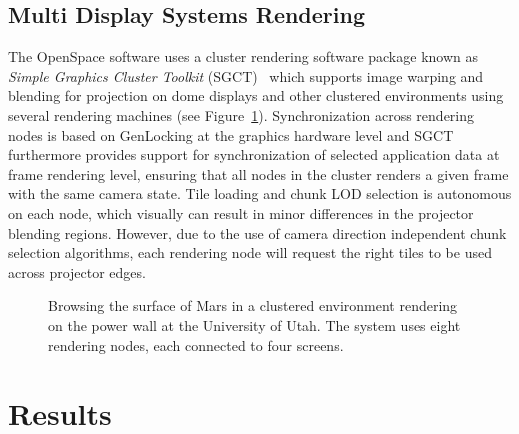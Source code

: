 \documentclass[journal]{vgtc}                %
\newcommand{\anderscomment}[1]{\textbf{[-Anders-~}
    \textcolor{cyan}{#1}
    \textbf{~]}}
\begin{document}
\subsection{Multi Display Systems Rendering} \label{sec:multidisplaysystems}
The OpenSpace software uses a cluster rendering software package known as \emph{Simple Graphics Cluster Toolkit} (SGCT)~\cite{sgct} which supports image warping and blending for projection on dome displays and other clustered environments using several rendering machines (see Figure~\ref{fig:power_wall}).
Synchronization across rendering nodes is based on GenLocking at the graphics hardware level and SGCT furthermore provides support for synchronization of selected application data at frame rendering level, ensuring that all nodes in the cluster renders a given frame with the same camera state.
Tile loading and chunk LOD selection is autonomous on each node, which visually can result in minor differences in the projector blending regions. However, due to the use of camera direction independent chunk selection algorithms, each rendering node will request the right tiles to be used across projector edges.

\begin{figure}
    \centering
        \caption{Browsing the surface of Mars in a clustered environment rendering on the power wall at the University of Utah. The system uses eight rendering nodes, each connected to four screens.}  \vspace{-4mm}
    \label{fig:power_wall}
\end{figure}

\section{Results}
\end{document}
